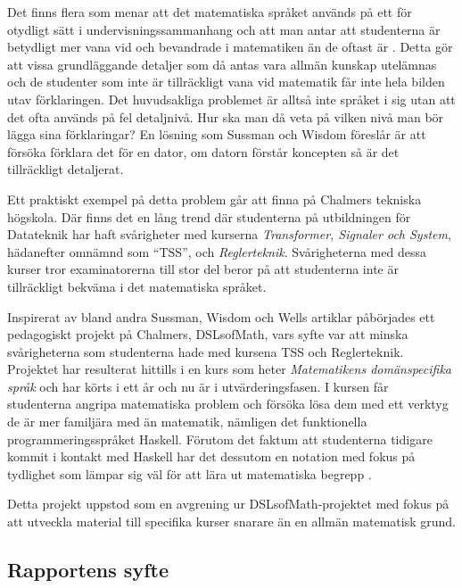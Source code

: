 \documentclass[]{article}
\begin{document}
Det finns flera som menar att det matematiska språket används på ett för
otydligt sätt i undervisningssammanhang och att man antar att studenterna
är betydligt mer vana vid och bevandrade i matematiken än de oftast är \cite{sussman2002role} \cite{wells1995communicating}.
Detta gör att vissa grundläggande detaljer som då antas vara allmän kunskap
utelämnas och de studenter som inte är tillräckligt vana vid matematik får inte
hela bilden utav förklaringen.
Det huvudsakliga problemet är alltså inte språket i sig utan att det ofta
används på fel detaljnivå. Hur ska man då veta på vilken nivå man bör lägga
sina förklaringar? En lösning som Sussman och Wisdom föreslår är att
försöka förklara det för en dator, om datorn förstår koncepten så är det
tillräckligt detaljerat.

Ett praktiskt exempel på detta problem går att finna på Chalmers tekniska högskola.
Där finns det en lång trend där studenterna på utbildningen för Datateknik har
haft svårigheter med kurserna \textit{Transformer, Signaler och System}, hädanefter
omnämnd som ``\gls{TSS}'', och \textit{Reglerteknik}.
Svårigheterna med dessa kurser tror examinatorerna till stor del beror på att
studenterna inte är tillräckligt bekväma i det matematiska språket.

Inspirerat av bland andra Sussman, Wisdom och Wells artiklar påbörjades ett
pedagogiskt projekt på Chalmers, DSLsofMath, vars syfte var att minska
svårigheterna som studenterna hade med kursena TSS och Reglerteknik.
Projektet har resulterat hittills i en kurs som heter
\textit{Matematikens domänspecifika språk} och har körts i ett år och nu
är i utvärderingsfasen. I kursen får studenterna angripa
matematiska problem och försöka lösa dem med ett verktyg de är
mer familjära med än matematik, nämligen det funktionella
programmerings\-språket Haskell. Förutom det faktum att studenterna tidigare
kommit i kontakt med Haskell har det dessutom en notation med fokus på
tydlighet som lämpar sig väl för att lära ut matematiska begrepp
\cite{TFPIE15_DSLsofMath_IonescuJansson}.

Detta projekt uppstod som en avgrening ur DSLsofMath-projektet med fokus
på att utveckla material till specifika kurser snarare än en allmän matematisk grund.

\subsection{Rapportens syfte}
\end{document}
